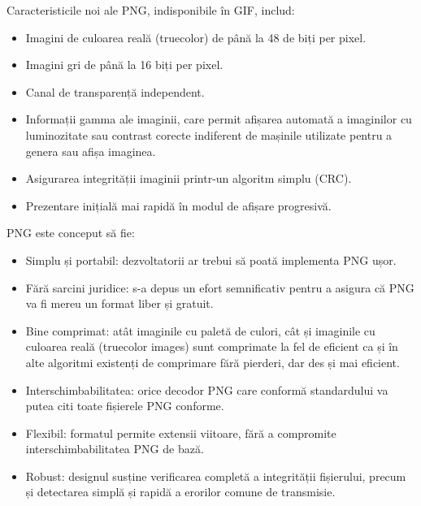 \documentclass[a4paper,12pt]{report}
\begin{document}
Caracteristicile noi ale PNG, indisponibile în GIF, includ:

\begin{itemize}
    \item Imagini de culoarea reală (truecolor) de până la 48 de biți per pixel.

    \item Imagini gri de până la 16 biți per pixel.

    \item Canal de transparență independent.

    \item 
        Informații gamma ale imaginii, care permit afișarea automată a imaginilor
        cu luminozitate sau contrast corecte indiferent de mașinile utilizate
        pentru a genera sau afișa imaginea.

    \item Asigurarea integrității imaginii printr-un algoritm simplu (\ac{CRC}).

    \item Prezentare inițială mai rapidă în modul de afișare progresivă.
\end{itemize}

PNG este conceput să fie:

\begin{itemize}
    \item
        Simplu și portabil: dezvoltatorii ar trebui să poată implementa PNG ușor.

    \item
        Fără sarcini juridice: s-a depus un efort semnificativ pentru a asigura
        că PNG va fi mereu un format liber și gratuit.

    \item
        Bine comprimat: atât imaginile cu paletă de culori,
        cât și imaginile cu culoarea reală (truecolor images)
        sunt comprimate la fel de eficient ca și în alte
        algoritmi existenți de comprimare fără pierderi,
        dar des și mai eficient.

    \item
        Interschimbabilitatea: orice decodor PNG care conformă standardului
        va putea citi toate fișierele PNG conforme.

    \item
        Flexibil: formatul permite extensii viitoare,
        fără a compromite interschimbabilitatea PNG de bază.

    \item
        Robust: designul susține verificarea completă a integrității fișierului,
        precum și detectarea simplă și rapidă a erorilor comune de transmisie.
\end{itemize}
\end{document}
